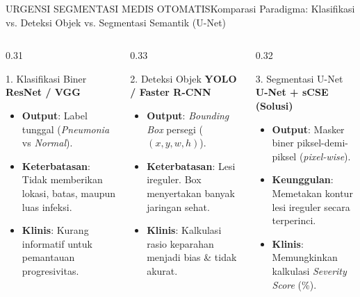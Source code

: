 \documentclass[aspectratio=169,11pt]{beamer}
\begin{document}
\begin{frame}{URGENSI SEGMENTASI MEDIS OTOMATIS}{Komparasi Paradigma: Klasifikasi vs. Deteksi Objek vs. Segmentasi Semantik (U-Net)}
\begin{columns}[T]
  \begin{column}{0.31\textwidth}
    \begin{block}{\footnotesize 1. Klasifikasi Biner}
      \scriptsize \textbf{ResNet / VGG}
      \begin{itemize}\scriptsize
        \item \textbf{Output}: Label tunggal (\textit{Pneumonia} vs \textit{Normal}).
        \item \textbf{Keterbatasan}: Tidak memberikan lokasi, batas, maupun luas infeksi.
        \item \textbf{Klinis}: Kurang informatif untuk pemantauan progresivitas.
      \end{itemize}
    \end{block}
  \end{column}

  \begin{column}{0.33\textwidth}
    \begin{block}{\footnotesize 2. Deteksi Objek}
      \scriptsize \textbf{YOLO / Faster R-CNN}
      \begin{itemize}\scriptsize
        \item \textbf{Output}: \textit{Bounding Box} persegi ($(x,y,w,h)$).
        \item \textbf{Keterbatasan}: Lesi ireguler. Box menyertakan banyak jaringan sehat.
        \item \textbf{Klinis}: Kalkulasi rasio keparahan menjadi bias \& tidak akurat.
      \end{itemize}
    \end{block}
  \end{column}

  \begin{column}{0.32\textwidth}
    \begin{block}{\footnotesize 3. Segmentasi U-Net}
      \scriptsize \textbf{U-Net + sCSE (Solusi)}
      \begin{itemize}\scriptsize
        \item \textbf{Output}: Masker biner piksel-demi-piksel (\textit{pixel-wise}).
        \item \textbf{Keunggulan}: Memetakan kontur lesi ireguler secara terperinci.
        \item \textbf{Klinis}: Memungkinkan kalkulasi \textit{Severity Score} (\%).
      \end{itemize}
    \end{block}
  \end{column}
\end{columns}
\end{frame}
\end{document}
